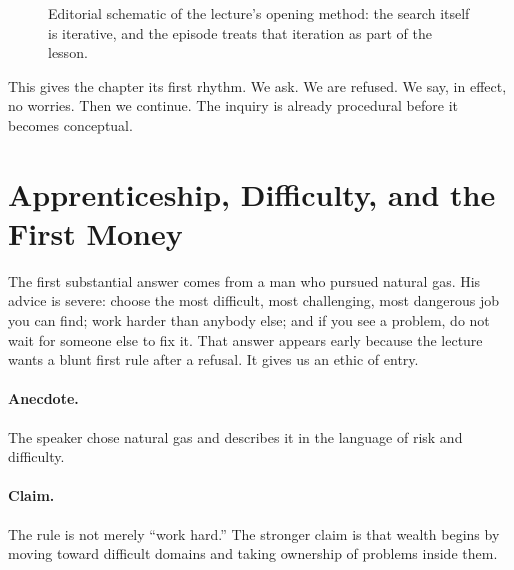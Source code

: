 \begin{figure}[h]
\centering
{}
\caption{Editorial schematic of the lecture's opening method: the search itself is iterative, and the episode treats that iteration as part of the lesson.}
\end{figure}

This gives the chapter its first rhythm. We ask. We are refused. We say, in effect, no worries. Then we continue. The inquiry is already procedural before it becomes conceptual.

\section{Apprenticeship, Difficulty, and the First Money}

The first substantial answer comes from a man who pursued natural gas. His advice is severe: choose the most difficult, most challenging, most dangerous job you can find; work harder than anybody else; and if you see a problem, do not wait for someone else to fix it. That answer appears early because the lecture wants a blunt first rule after a refusal. It gives us an ethic of entry.

\paragraph{Anecdote.}
The speaker chose natural gas and describes it in the language of risk and difficulty.

\paragraph{Claim.}
The rule is not merely ``work hard.'' The stronger claim is that wealth begins by moving toward difficult domains and taking ownership of problems inside them.

